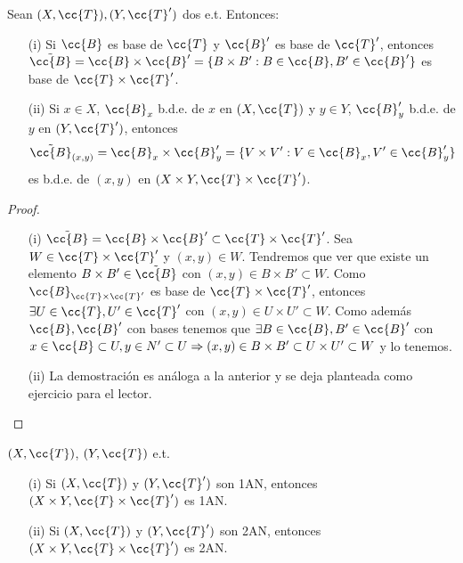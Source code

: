 \begin{prop}
    Sean $(X, \cc{T}), (Y, \cc{T}')$ dos e.t. Entonces:
    \begin{enumerate}
        \item[(i)] Si $\cc{B}$ es base de $\cc{T}$ y $\cc{B}'$ es base de $\cc{T}'$, entonces $\tilde{\cc{B}}=\cc{B}\times \cc{B}'=\{B\times B': B\in \cc{B}, B'\in \cc{B}'\}$ es base de $\cc{T}\times \cc{T}'$.
        \item[(ii)] Si $x\in X$, $\cc{B}_x$ b.d.e. de $x$ en $(X, \cc{T})$ y $y\in Y$, $\cc{B}_y'$ b.d.e. de $y$ en $(Y, \cc{T}')$, entonces
        \begin{gather*}
            \tilde{\cc{B}}_{(x,y)}=\cc{B}_x\times \cc{B}_y' =\{V\times V': V\in \cc{B}_x, V'\in \cc{B}_y'\}
        \end{gather*}
        es b.d.e. de $(x,y)$ en $(X\times Y, \cc{T}\times \cc{T}')$.
    \end{enumerate}
    \begin{proof}\
        \begin{enumerate}
            \item[(i)] $\tilde{\cc{B}}=\cc{B}\times \cc{B}'\subset \cc{T}\times \cc{T}'$. Sea $W\in \cc{T}\times \cc{T}'$ y $(x,y)\in W$. Tendremos que ver que existe un elemento $B\times B'\in \tilde{\cc{B}}$ con $(x,y)\in B\times B'\subset W$. Como $\cc{B}_{\cc{T}\times \cc{T}'}$ es base de $\cc{T}\times \cc{T}'$, entonces $\exists U\in \cc{T}, U'\in \cc{T}'$ con $(x,y)\in U\times U'\subset W$. Como además $\cc{B}, \cc{B}'$ con bases tenemos que $\exists B\in \cc{B}, B'\in \cc{B}'$ con $x\in \cc{B}\subset U, y \in N'\subset U\Rightarrow (x,y)\in B\times B'\subset U\times U'\subset W$ y lo tenemos.
            \item[(ii)] La demostración es análoga a la anterior y se deja planteada como ejercicio para el lector.
        \end{enumerate}
    \end{proof}
\end{prop}

\begin{coro}
    $(X, \cc{T})$, $(Y, \cc{T})$ e.t.
    \begin{enumerate}
        \item[(i)] Si $(X, \cc{T})$ y $(Y, \cc{T}')$ son 1AN, entonces $(X\times Y, \cc{T}\times \cc{T}')$ es 1AN.
        \item[(ii)] Si $(X, \cc{T})$ y $(Y, \cc{T}')$ son 2AN, entonces $(X\times Y, \cc{T}\times \cc{T}')$ es 2AN.
    \end{enumerate}
    \endsquare
\end{coro}

